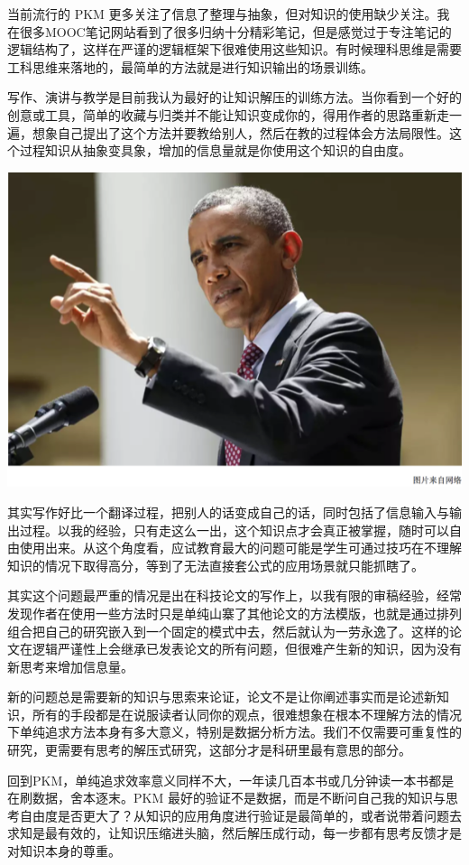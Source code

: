 \documentclass[]{book}
\begin{document}
当前流行的 PKM
更多关注了信息了整理与抽象，但对知识的使用缺少关注。我在很多MOOC笔记网站看到了很多归纳十分精彩笔记，但是感觉过于专注笔记的逻辑结构了，这样在严谨的逻辑框架下很难使用这些知识。有时候理科思维是需要工科思维来落地的，最简单的方法就是进行知识输出的场景训练。

写作、演讲与教学是目前我认为最好的让知识解压的训练方法。当你看到一个好的创意或工具，简单的收藏与归类并不能让知识变成你的，得用作者的思路重新走一遍，想象自己提出了这个方法并要教给别人，然后在教的过程体会方法局限性。这个过程知识从抽象变具象，增加的信息量就是你使用这个知识的自由度。

\includegraphics[width=8.33in]{images/gtd3}

其实写作好比一个翻译过程，把别人的话变成自己的话，同时包括了信息输入与输出过程。以我的经验，只有走这么一出，这个知识点才会真正被掌握，随时可以自由使用出来。从这个角度看，应试教育最大的问题可能是学生可通过技巧在不理解知识的情况下取得高分，等到了无法直接套公式的应用场景就只能抓瞎了。

其实这个问题最严重的情况是出在科技论文的写作上，以我有限的审稿经验，经常发现作者在使用一些方法时只是单纯山寨了其他论文的方法模版，也就是通过排列组合把自己的研究嵌入到一个固定的模式中去，然后就认为一劳永逸了。这样的论文在逻辑严谨性上会继承已发表论文的所有问题，但很难产生新的知识，因为没有新思考来增加信息量。

新的问题总是需要新的知识与思索来论证，论文不是让你阐述事实而是论述新知识，所有的手段都是在说服读者认同你的观点，很难想象在根本不理解方法的情况下单纯追求方法本身有多大意义，特别是数据分析方法。我们不仅需要可重复性的研究，更需要有思考的解压式研究，这部分才是科研里最有意思的部分。

回到PKM，单纯追求效率意义同样不大，一年读几百本书或几分钟读一本书都是在刷数据，舍本逐末。PKM
最好的验证不是数据，而是不断问自己我的知识与思考自由度是否更大了？从知识的应用角度进行验证是最简单的，或者说带着问题去求知是最有效的，让知识压缩进头脑，然后解压成行动，每一步都有思考反馈才是对知识本身的尊重。
\end{document}
